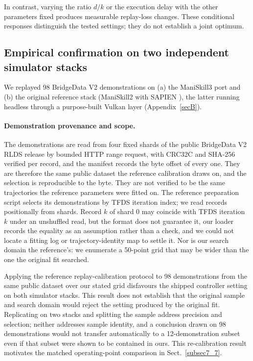 \documentclass[pdflatex,iicol,sn-apa]{sn-jnl}
\theoremstyle{remark}
\begin{document}
In contrast, varying the ratio $d/k$ or the execution delay with the other parameters fixed
produces measurable replay-loss changes. These conditional responses distinguish the tested
settings; they do not establish a joint optimum.

\subsection{Empirical confirmation on two independent simulator stacks}\label{subsec4_3}

We replayed 98 BridgeData V2 demonstrations \citep{walke2023bridgedata} on (a) the ManiSkill3 port
\citep{tao2024maniskill3} and (b) the original reference stack (ManiSkill2
\citep{gu2023maniskill2} with SAPIEN \citep{xiang2020sapien}), the latter running headless through a
purpose-built Vulkan layer (Appendix~\ref{secB}).

\paragraph{Demonstration provenance and scope.}
The demonstrations are read from four fixed shards of the public
BridgeData V2 RLDS release by bounded HTTP range request, with CRC32C and SHA-256 verified per
record, and the manifest records the byte offset of every one. They are therefore the same
public dataset the reference calibration draws on, and the selection is reproducible to the byte.
They are not verified to be the same trajectories the reference parameters were fitted on.
The reference preparation script selects its demonstrations by TFDS iteration index; we read records
positionally from shards. Record $k$ of shard 0 may coincide with TFDS iteration $k$ under an
unshuffled read, but the format does not guarantee it, our loader records the equality as an
assumption rather than a check, and we could not locate a fitting log or trajectory-identity map to
settle it. Nor is our search domain the reference's: we enumerate a 50-point grid that may be wider
than the one the original fit searched.

Applying the reference replay-calibration protocol to 98 demonstrations from the same public
dataset over our stated grid disfavours the shipped controller setting on both simulator stacks. This result does not establish that the original sample and search domain would reject
the setting produced by the original fit. Replicating on two stacks and splitting the sample address precision and
selection; neither addresses sample identity, and a conclusion drawn on 98 demonstrations would not
transfer automatically to a 12-demonstration subset even if that subset were shown to be contained
in ours. This re-calibration result motivates the matched operating-point comparison in
Sect.~\ref{subsec7_7}.
\end{document}
